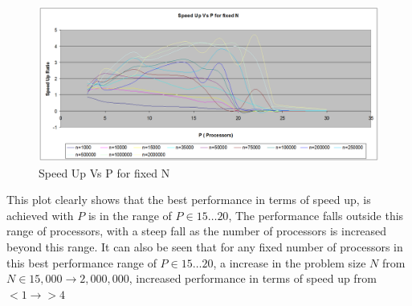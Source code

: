 \documentclass[twoside,11pt]{article}\usepackage{amsmath,amsfonts,amsthm,fullpage}
\begin{document}
\begin{figure}[!htbp]
\centering
\includegraphics[scale=.46]{charts/n-p-speedup} 
\caption{Speed Up Vs P for fixed N}
\label{Speed Up Vs P for fixed N}
\end{figure}
This plot clearly shows that the best performance in terms of speed up, is achieved with $P$ is in the range of $P \in 15 \dots 20$, The performance falls outside this range of processors, with a steep fall as the number of processors is increased beyond this range. It can also be seen that for any fixed number of processors in this best performance range of  $P \in 15 \dots 20$, a increase in the problem size $N$ from $N \in 15,000 \to 2,000,000$, increased performance in terms of speed up from $<1 \to >4$
\pagebreak
\end{document}
